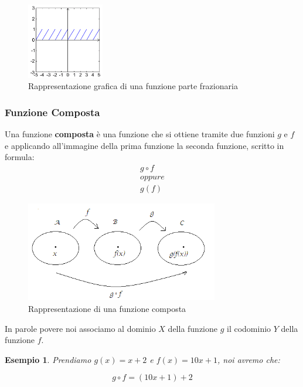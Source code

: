 \documentclass{article}
\newtheorem{exmp}{Esempio}[section]
\theoremstyle{definition}
\begin{document}
\begin{figure}[!h]
        \centering
                \includegraphics[width=0.3\textwidth]{esempio_funzione_parte_frazionaria.png}
                \caption{Rappresentazione grafica di una funzione parte frazionaria}\label{fig:esempio_funzione_parte_frazionaria}
\end{figure}


\subsubsection{Funzione Composta}\label{sec:funzione_composta}
Una funzione \textbf{composta} è una funzione che si ottiene tramite due funzioni $ g $ e $ f $ e applicando all'immagine della prima funzione la seconda funzione, scritto in formula:
\begin{align*}
        g \circ f \\
        oppure \\
        g(f)
\end{align*}

\begin{figure}[h]
        \centering
                \includegraphics[width=0.75\textwidth]{esempio_funzione_composta.png}
                \caption{Rappresentazione di una funzione composta}\label{fig:esempio_funzione_composta}
\end{figure}

In parole povere noi associamo al dominio $ X $ della funzione $ g $ il codominio $ Y $ della funzione $ f $. \par
\begin{exmp}
        Prendiamo $ g(x) = x + 2 $ e $ f(x) = 10x + 1 $, noi avremo che:
                
                \begin{equation*}
                        g \circ f = (10x + 1) + 2
                \end{equation*}
\end{exmp}
\end{document}
